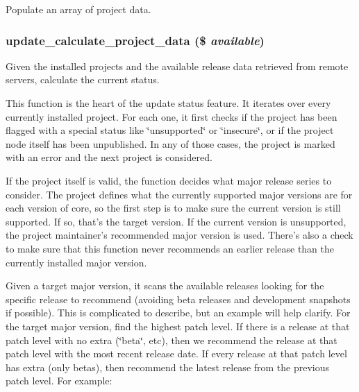 Populate an array of project data. \hypertarget{update_8compare_8inc_a0663304dc4634e4109c896f214ea791}{
\subsubsection[{update\_\-calculate\_\-project\_\-data}]{\setlength{\rightskip}{0pt plus 5cm}update\_\-calculate\_\-project\_\-data (\$ {\em available})}}
\label{update_8compare_8inc_a0663304dc4634e4109c896f214ea791}


Given the installed projects and the available release data retrieved from remote servers, calculate the current status.

This function is the heart of the update status feature. It iterates over every currently installed project. For each one, it first checks if the project has been flagged with a special status like \char`\"{}unsupported\char`\"{} or \char`\"{}insecure\char`\"{}, or if the project node itself has been unpublished. In any of those cases, the project is marked with an error and the next project is considered.

If the project itself is valid, the function decides what major release series to consider. The project defines what the currently supported major versions are for each version of core, so the first step is to make sure the current version is still supported. If so, that's the target version. If the current version is unsupported, the project maintainer's recommended major version is used. There's also a check to make sure that this function never recommends an earlier release than the currently installed major version.

Given a target major version, it scans the available releases looking for the specific release to recommend (avoiding beta releases and development snapshots if possible). This is complicated to describe, but an example will help clarify. For the target major version, find the highest patch level. If there is a release at that patch level with no extra (\char`\"{}beta\char`\"{}, etc), then we recommend the release at that patch level with the most recent release date. If every release at that patch level has extra (only betas), then recommend the latest release from the previous patch level. For example:


